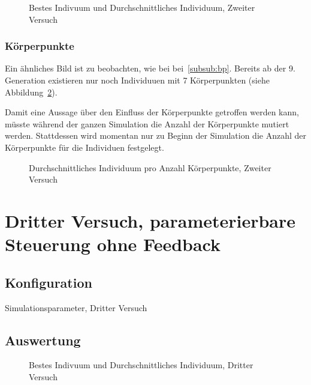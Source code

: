         \begin{figure}
          
          \caption{Bestes Indivuum und Durchschnittliches Individuum, Zweiter Versuch\label{fig:graphSecond}}
        \end{figure}

      \subsubsection{Körperpunkte}

        Ein ähnliches Bild ist zu beobachten, wie bei bei~\ref{subsub:bp}.
        Bereits ab der 9\@. Generation existieren nur noch Individuuen mit 7 Körperpunkten (siehe Abbildung~\ref{fig:graphBpSecond}).

        Damit eine Aussage über den Einfluss der Körperpunkte getroffen werden kann,
        müsste während der ganzen Simulation die Anzahl der Körperpunkte mutiert werden.
        Stattdessen wird momentan nur zu Beginn der Simulation die Anzahl der Körperpunkte für die Individuen festgelegt.

        \begin{figure}
          
          \caption{Durchschnittliches Individuum pro Anzahl Körperpunkte, Zweiter Versuch\label{fig:graphBpSecond}}
        \end{figure}

    \section{Dritter Versuch, parameterierbare Steuerung ohne Feedback}

      \subsection{Konfiguration}

        \begin{table}[H]
          
          \caption{Simulationsparameter, Dritter Versuch}
        \end{table}

      \subsection{Auswertung}



        \begin{figure}
          
          \caption{Bestes Indivuum und Durchschnittliches Individuum, Dritter Versuch\label{fig:graphThird}}
        \end{figure}

